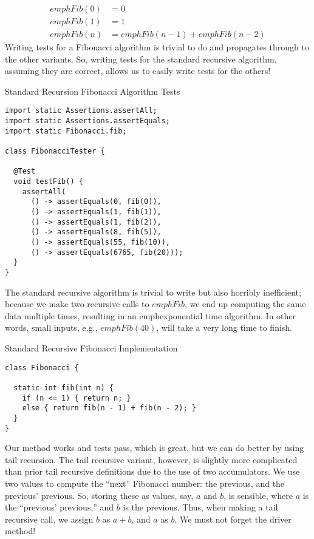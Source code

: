 \begin{align*}
  emph{Fib}(0) &= 0\\
  emph{Fib}(1) &= 1\\
  emph{Fib}(n) &= emph{Fib}(n - 1) + emph{Fib}(n - 2)
\end{align*}
Writing tests for a Fibonacci algorithm is trivial to do and propagates through to the other variants. So, writing tests for the standard recursive algorithm, assuming they are correct, allows us to easily write tests for the others!

\begin{cl}[]{Standard Recursion Fibonacci Algorithm Tests}
\begin{lstlisting}[language=MyJava]
import static Assertions.assertAll;
import static Assertions.assertEquals;
import static Fibonacci.fib;

class FibonacciTester {

  @Test
  void testFib() {
    assertAll(
      () -> assertEquals(0, fib(0)),
      () -> assertEquals(1, fib(1)),
      () -> assertEquals(1, fib(2)),
      () -> assertEquals(8, fib(5)),
      () -> assertEquals(55, fib(10)),
      () -> assertEquals(6765, fib(20)));
  }
}
\end{lstlisting}
\end{cl}

The standard recursive algorithm is trivial to write but also horribly inefficient; because we make two recursive calls to $emph{Fib}$, we end up computing the same data multiple times, resulting in an emph{exponential time algorithm}. In other words, small inputs, e.g., $emph{Fib}(40)$, will take a very long time to finish.

\begin{cl}[]{Standard Recursive Fibonacci Implementation}
\begin{lstlisting}[language=MyJava]
class Fibonacci {

  static int fib(int n) {
    if (n <= 1) { return n; } 
    else { return fib(n - 1) + fib(n - 2); }
  }
}
\end{lstlisting}
\end{cl}

Our method works and tests pass, which is great, but we can do better by using tail recursion. The tail recursive variant, however, is slightly more complicated than prior tail recursive definitions due to the use of two accumulators. We use two values to compute the ``next'' Fibonacci number: the previous, and the previous' previous. So, storing these as values, say, $a$ and $b$, is sensible, where $a$ is the ``previous' previous,'' and $b$ is the previous. Thus, when making a tail recursive call, we assign $b$ as $a + b$, and $a$ as $b$. We must not forget the driver method!

